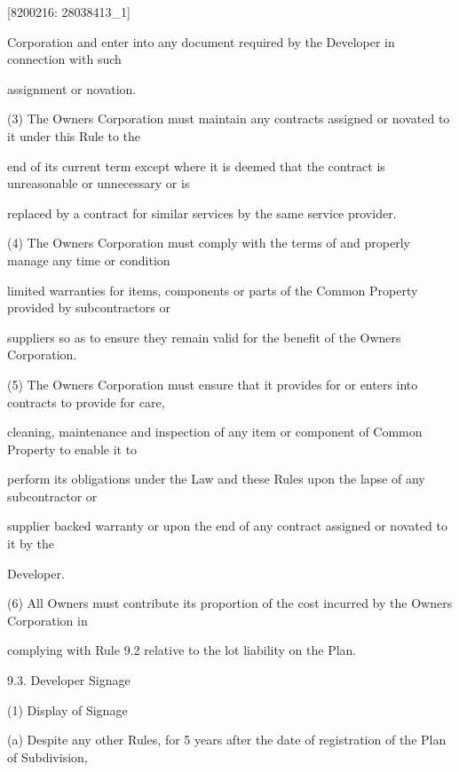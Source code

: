 \documentclass{article}
\begin{document}
{\fontsize{7.02}{1}[8200216: 28038413\_1] }

{\fontsize{10.02}{1}Corporation and enter into any document required by the Developer in connection with such }

{\fontsize{10.02}{1}assignment or novation. }

{\fontsize{9.962}{1}(3) The Owners Corporation must maintain any contracts assigned or novated to it under this Rule to the }

{\fontsize{10.02}{1}end of its current term except where it is deemed that the contract is unreasonable or unnecessary or is }

{\fontsize{10.02}{1}replaced by a contract for similar services by the same service provider. }


{\fontsize{9.962}{1}(4) The Owners Corporation must comply with the terms of and properly manage any time or condition }

{\fontsize{10.02}{1}limited warranties for items, components or parts of the Common Property provided by subcontractors or }

{\fontsize{10.02}{1}suppliers so as to ensure they remain valid for the benefit of the Owners Corporation. }

{\fontsize{9.962}{1}(5) The Owners Corporation must ensure that it provides for or enters into contracts to provide for care, }

{\fontsize{10.02}{1}cleaning, maintenance and inspection of any item or component of Common Property to enable it to }

{\fontsize{10.02}{1}perform its obligations under the Law and these Rules upon the lapse of any subcontractor or }

{\fontsize{10.02}{1}supplier backed warranty or upon the end of any contract assigned or novated to it by the }

{\fontsize{10.02}{1}Developer. }

{\fontsize{9.962}{1}(6) All Owners must contribute its proportion of the cost incurred by the Owners Corporation in }

{\fontsize{10.02}{1}complying with Rule 9.2 relative to the lot liability on the Plan. }

{\fontsize{9.99}{1}9.3. Developer Signage }

{\fontsize{9.962}{1}(1) Display of Signage }

{\fontsize{9.962}{1}(a) Despite any other Rules, for 5 years after the date of registration of the Plan of Subdivision, }
\end{document}
